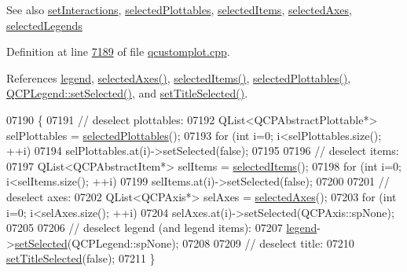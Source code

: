 \begin{DoxySeeAlso}{See also}
\hyperlink{a00116_add9cc886ff5257f64fb4117cf6c135fe}{set\+Interactions}, \hyperlink{a00116_a6721b8c689bb7f2f400987e580508fe8}{selected\+Plottables}, \hyperlink{a00116_a3714adb0a26b8cf1bd70740a7ea464c4}{selected\+Items}, \hyperlink{a00116_aa6baf867e8beb96ed5bd471f83ece903}{selected\+Axes}, \hyperlink{a00116_a1ea6297300c3e2770e65f95836411755}{selected\+Legends} 
\end{DoxySeeAlso}


Definition at line \hyperlink{a00115_source_l07189}{7189} of file \hyperlink{a00115_source}{qcustomplot.\+cpp}.



References \hyperlink{a00116_source_l02077}{legend}, \hyperlink{a00115_source_l07154}{selected\+Axes()}, \hyperlink{a00116_a3714adb0a26b8cf1bd70740a7ea464c4}{selected\+Items()}, \hyperlink{a00115_source_l06585}{selected\+Plottables()}, \hyperlink{a00115_source_l02938}{Q\+C\+P\+Legend\+::set\+Selected()}, and \hyperlink{a00115_source_l06382}{set\+Title\+Selected()}.


\begin{DoxyCode}
07190 \{
07191   \textcolor{comment}{// deselect plottables:}
07192   QList<QCPAbstractPlottable*> selPlottables = \hyperlink{a00116_a6721b8c689bb7f2f400987e580508fe8}{selectedPlottables}();
07193   \textcolor{keywordflow}{for} (\textcolor{keywordtype}{int} i=0; i<selPlottables.size(); ++i)
07194     selPlottables.at(i)->setSelected(\textcolor{keyword}{false});
07195   
07196   \textcolor{comment}{// deselect items:}
07197   QList<QCPAbstractItem*> selItems = \hyperlink{a00116_a3714adb0a26b8cf1bd70740a7ea464c4}{selectedItems}();
07198   \textcolor{keywordflow}{for} (\textcolor{keywordtype}{int} i=0; i<selItems.size(); ++i)
07199     selItems.at(i)->setSelected(\textcolor{keyword}{false});
07200   
07201   \textcolor{comment}{// deselect axes:}
07202   QList<QCPAxis*> selAxes = \hyperlink{a00116_aa6baf867e8beb96ed5bd471f83ece903}{selectedAxes}();
07203   \textcolor{keywordflow}{for} (\textcolor{keywordtype}{int} i=0; i<selAxes.size(); ++i)
07204     selAxes.at(i)->setSelected(QCPAxis::spNone);
07205   
07206   \textcolor{comment}{// deselect legend (and legend items):}
07207   \hyperlink{a00116_a75acd427ec48e9a9d2ae6a17817cc490}{legend}->\hyperlink{a00045_a752c48b30f8ba870b55e79659385f107}{setSelected}(QCPLegend::spNone);
07208   
07209   \textcolor{comment}{// deselect title:}
07210   \hyperlink{a00116_aa89e06c04804ff2a0994ccb1aa80d131}{setTitleSelected}(\textcolor{keyword}{false});
07211 \}
\end{DoxyCode}


